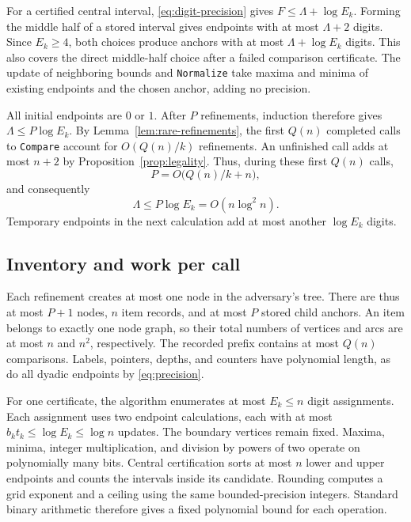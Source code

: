 For a certified central interval, \eqref{eq:digit-precision} gives
$F\le\Lambda+\log E_k$. Forming the middle half of a stored interval
gives endpoints with at most $\Lambda+2$ digits. Since $E_k\ge4$, both
choices produce anchors with at most $\Lambda+\log E_k$ digits. This
also covers the direct middle-half choice after a failed comparison
certificate. The update of neighboring bounds and
\texttt{Normalize} take maxima and minima of existing endpoints and the
chosen anchor, adding no precision.

All initial endpoints are $0$ or $1$. After $P$ refinements, induction
therefore gives $\Lambda\le P\log E_k$. By
Lemma~\ref{lem:rare-refinements}, the first $Q(n)$ completed calls to
\texttt{Compare} account for $O(Q(n)/k)$ refinements. An unfinished call
adds at most $n+2$ by Proposition~\ref{prop:legality}. Thus, during these
first $Q(n)$ calls,
\begin{equation}\label{eq:refinement-runtime}
P=O\bigl(Q(n)/k+n\bigr),
\end{equation}
and consequently
\begin{equation}\label{eq:precision}
\Lambda\le P\log E_k=O(n\log^2 n).
\end{equation}
Temporary endpoints in the next calculation add at most another
$\log E_k$ digits.

\subsection{Inventory and work per call}

Each refinement creates at most one node in the adversary's tree. There are thus
at most $P+1$ nodes, $n$ item records, and at most $P$ stored child anchors.
An item belongs to exactly one node graph, so their total numbers of
vertices and arcs are at most $n$ and $n^2$, respectively. The recorded
prefix contains at most $Q(n)$ comparisons. Labels, pointers, depths,
and counters have polynomial length, as do all dyadic endpoints by
\eqref{eq:precision}.

For one certificate, the algorithm enumerates at most $E_k\le n$ digit
assignments. Each assignment uses two endpoint calculations, each with
at most $b_k t_k\le\log E_k\le\log n$ updates. The boundary vertices
remain fixed. Maxima, minima, integer multiplication, and division by
powers of two operate on polynomially many bits. Central certification
sorts at most $n$ lower and upper endpoints and counts the intervals
inside its candidate. Rounding computes a grid exponent and a ceiling
using the same bounded-precision integers. Standard binary arithmetic
therefore gives a fixed polynomial bound for each operation.

